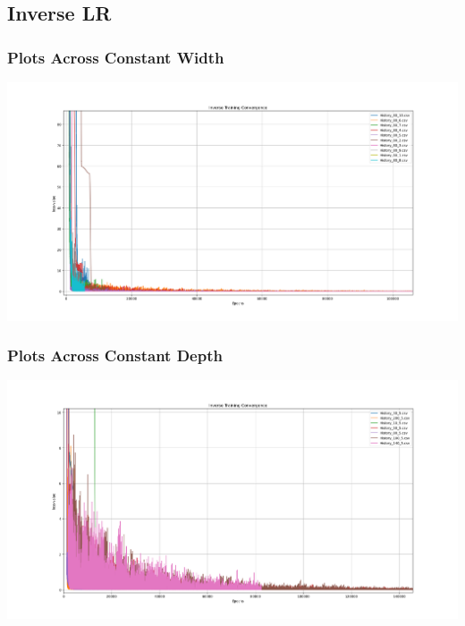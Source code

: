 \documentclass[a4paper, 12pt]{report}
\def\size{0.39}
\begin{document}
\begin{center}
\subsection{Inverse LR}

\subsubsection{Plots Across Constant Width}

\includegraphics[scale=\size]{Inv_Cons_w.png}
\subsubsection{Plots Across Constant Depth}

\includegraphics[scale=\size]{Inv_Cons_D.png}

\end{center}
\end{document}
